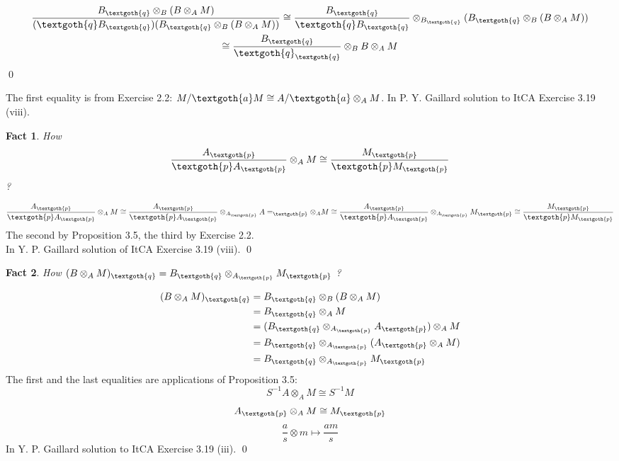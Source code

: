 \documentclass{article}
\newtheorem{theorem}{Fact}[section]
\begin{document}
\begin{gather*}
\frac{B_\textgoth{q} \otimes_B (B \otimes_A M)}{(\textgoth{q} B_\textgoth{q})(B_\textgoth{q} \otimes_B (B \otimes_A M))}
\cong
\frac{B_\textgoth{q}}{\textgoth{q} B_\textgoth{q}} \otimes_{B_\textgoth{q}} (B_\textgoth{q} \otimes_B (B \otimes_A M)) \\
\cong
\frac{B_\textgoth{q}}{\textgoth{q}_\textgoth{q}} \otimes_B B \otimes_A M
\end{gather*}
\qed

\noindent
The first equality is from Exercise 2.2: $M/\textgoth{a}M \cong 
A/\textgoth{a} \otimes_A M$. 
In P. Y. Gaillard solution to ItCA Exercise 3.19 (viii).

\bigskip
\begin{theorem}
How
\[
\frac{A_\textgoth{p}}{\textgoth{p} A_\textgoth{p}} \otimes_A M 
\cong
\frac{M_\textgoth{p}}{\textgoth{p} M_\textgoth{p}}
\]
?
\end{theorem}

\begin{gather*}
\frac{A_\textgoth{p}}{\textgoth{p} A_\textgoth{p}} \otimes_A M 
\cong 
\frac{A_\textgoth{p}}{\textgoth{p} A_\textgoth{p}} \otimes_{A_\textgoth{p}} A=_\textgoth{p} \otimes_A M 
\cong
\frac{A_\textgoth{p}}{\textgoth{p} A_\textgoth{p}} \otimes_{A_\textgoth{p}} M_\textgoth{p} 
\cong
\frac{M_\textgoth{p}}{\textgoth{p} M_\textgoth{p}}
\end{gather*}
\noindent
The second by Proposition 3.5, the third by Exercise 2.2. \\
In Y. P. Gaillard solution of ItCA Exercise 3.19 (viii).
\qed

\bigskip
\begin{theorem}
How $(B \otimes_A M)_\textgoth{q} = B_\textgoth{q} \otimes_{A_\textgoth{p}} M_\textgoth{p}$ ?
\end{theorem}

\noindent
\begin{equation*}
\begin{split}
(B \otimes_A M)_\textgoth{q} & = B_\textgoth{q} \otimes_B (B \otimes_A M) \\
                             & = B_\textgoth{q} \otimes_A M \\
                             & = (B_\textgoth{q} \otimes_{A_\textgoth{p}} A_\textgoth{p}) \otimes_A M \\
                             & = B_\textgoth{q} \otimes_{A_\textgoth{p}} (A_\textgoth{p} \otimes_A M) \\
                             & = B_\textgoth{q} \otimes_{A_\textgoth{p}} M_\textgoth{p}
\end{split}
\end{equation*}
\noindent
The first and the last equalities are applications of Proposition 3.5:
\[
  S^{-1}A \otimes_A M \cong S^{-1}M
\]
\[
  A_\textgoth{p} \otimes_A M \cong M_\textgoth{p}
\]
\[
\frac{a}{s} \otimes m \mapsto \frac{am}{s}
\]
In Y. P. Gaillard solution to ItCA Exercise 3.19 (iii).
\qed
\end{document}
